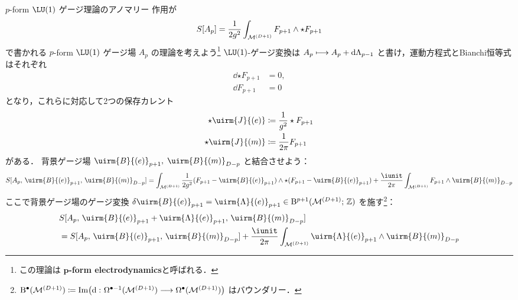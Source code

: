 \documentclass[TQFT_main]{subfiles}
\begin{document}
\begin{myexample}[label=ex:anomaly-p-formQED]{$p$-form $\LU(1)$ ゲージ理論のアノマリー}
    作用が
    \begin{align}
        S[A_p] = \frac{1}{2g^2} \int_{\mathcal{M}^{(D+1)}} F_{p+1} \wedge \star F_{p+1}
    \end{align}
    で書かれる $p$-form $\LU(1)$ ゲージ場 $A_p$ の理論を考えよう\footnote{この理論は $\bm{p}$\textbf{-form electrodynamics}と呼ばれる．} $\LU(1)$-ゲージ変換は $A_p \longmapsto A_p + \dd{\Lambda_{p-1}}$ と書け，運動方程式とBianchi恒等式はそれぞれ
    \begin{align}
        \dd{\star F_{p+1}} &= 0, \\
        \dd{F_{p+1}} &= 0
    \end{align}
    となり，これらに対応して2つの保存カレント
    \begin{align}
        \star \uirm{J}{(e)} &\coloneqq \frac{1}{g^2} \star F_{p+1} \\
        \star \uirm{J}{(m)} &\coloneqq \frac{1}{2\pi}F_{p+1}
    \end{align}
    がある．
    背景ゲージ場 $\uirm{B}{(e)}_{p+1},\; \uirm{B}{(m)}_{D-p}$ と結合させよう：
    \begin{align}
        S[A_p,\, \uirm{B}{(e)}_{p+1},\, \uirm{B}{(m)}_{D-p}] = \int_{\mfdcal{M}{D+1}}\frac{1}{2g^2} (F_{p+1} - \uirm{B}{(e)}_{p+1}) \wedge \star (F_{p+1} - \uirm{B}{(e)}_{p+1}) + \frac{\iunit}{2\pi}  \int_{\mfdcal{M}{D+1}} F_{p+1} \wedge \uirm{B}{(m)}_{D-p}
    \end{align}
    ここで背景ゲージ場のゲージ変換 $\delta \uirm{B}{(e)}_{p+1} = \uirm{\Lambda}{(e)}_{p+1} \in \mathrm{B}^{p+1}(\mfdcal{M}{D+1};\, \mathbb{Z})$ を施す\footnote{$\mathrm{B}^\bullet(\mathcal{M}^{(D+1)}) \coloneqq \Im \bigl( \dd{} \colon \Omega^{\bullet - 1}(\mathcal{M}^{(D+1)}) \longrightarrow \Omega^{\bullet}(\mathcal{M}^{(D+1)}) \bigr) $ はバウンダリー．}：
    \begin{align}
        &S[A_p,\, \uirm{B}{(e)}_{p+1} + \uirm{\Lambda}{(e)}_{p+1} ,\, \uirm{B}{(m)}_{D-p}] \\
        &= S[A_p,\, \uirm{B}{(e)}_{p+1},\, \uirm{B}{(m)}_{D-p}] + \frac{\iunit}{2\pi}  \int_{\mfdcal{M}{D+1}} \uirm{\Lambda}{(e)}_{p+1} \wedge \uirm{B}{(m)}_{D-p}
    \end{align}

\end{myexample}
\end{document}
